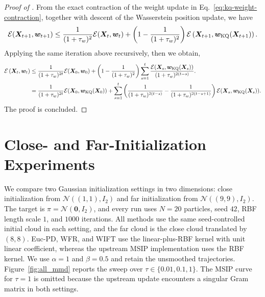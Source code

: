 \begin{proof}[Proof of ]
From the exact contraction of the weight update in
Eq.~\eqref{eq:kq-weight-contraction}, together with descent of the Wasserstein position update, we have
\begin{align}
\mathcal{E}(\bm{X}_{t+1},\bm{w}_{t+1}) \leq \frac{1}{(1+\tau_w)^2}
\mathcal{E}(\bm{X}_t,\bm{w}_t) + \left(
1 - \frac{1}{(1+\tau_w)^2}
\right)
\mathcal{E} \left(
\bm{X}_{t+1},
\bm{w}_{\mathrm{KQ}}(\bm{X}_{t+1}) \right).
\label{eq:wift-one-step-convergence}
\end{align}
Applying the same iteration above recursively, then we obtain, 
\begin{align*}
\mathcal{E} \left(\bm{X}_t, \bm{w}_t \right) &\leq \frac{1}{(1+\tau_w)^{2 t}} \mathcal{E}(\bm{X}_0, \bm{w}_0) +\left(1-\frac{1}{(1+\tau_w)^2}\right) \sum_{s=1}^t \frac{\mathcal{E}(\bm{X}_s, \bm{w}_{\mathrm{KQ}}(\bm{X}_s))}{(1+\tau_w)^{2(t-s)}} . \\
&= \frac{1}{(1+\tau_w)^{2 t}} \mathcal{E}(\bm{X}_0, \bm{w}_{\mathrm{KQ}}(\bm{X}_0)) + \sum_{s=1}^t \left( \frac{1}{(1+\tau_w)^{2(t-s)}} - \frac{1}{(1+\tau_w)^{2(t-s+1)}} \right) \mathcal{E}(\bm{X}_s, \bm{w}_{\mathrm{KQ}}(\bm{X}_s)). 
\end{align*} 
The proof is concluded. 
\end{proof}

\section{Close- and Far-Initialization Experiments}
\label{app:distant-initialization}

We compare two Gaussian initialization settings in two dimensions: close initialization from $\mathcal{N}((1,1),I_2)$ and far initialization from $\mathcal{N}((9,9),I_2)$. The target is $\pi=\mathcal{N}(\bm{0},I_2)$, and every run uses $N=20$ particles, seed $42$, RBF length scale $1$, and $1000$ iterations. All methods use the same seed-controlled initial cloud in each setting, and the far cloud is the close cloud translated by $(8,8)$. Euc-PD, WFR, and WIFT use the linear-plus-RBF kernel with unit linear coefficient, whereas the upstream MSIP implementation uses the RBF kernel. We use $\alpha=1$ and $\beta=0.5$ and retain the unsmoothed trajectories. Figure~\ref{fig:all_mmd} reports the sweep over $\tau\in\{0.01,0.1,1\}$. The MSIP curve for $\tau=1$ is omitted because the upstream update encounters a singular Gram matrix in both settings.

